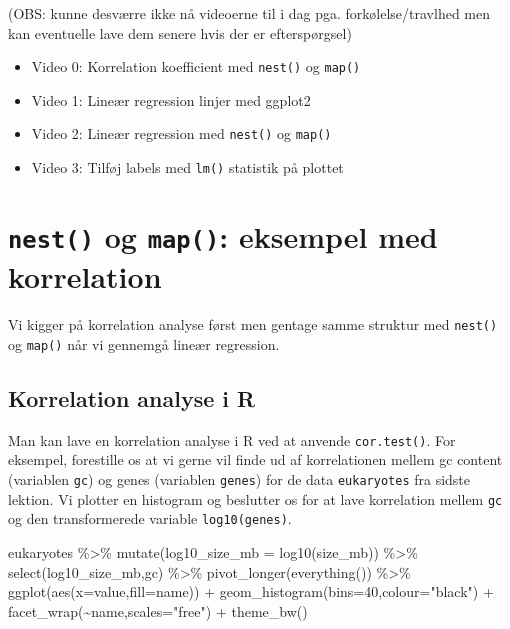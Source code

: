 \documentclass[
]{book}
\newenvironment{Shaded}{\begin{snugshade}}{\end{snugshade}}
\newcommand{\AttributeTok}[1]{\textcolor[rgb]{0.77,0.63,0.00}{#1}}
\newcommand{\DecValTok}[1]{\textcolor[rgb]{0.00,0.00,0.81}{#1}}
\newcommand{\FunctionTok}[1]{\textcolor[rgb]{0.00,0.00,0.00}{#1}}
\newcommand{\NormalTok}[1]{#1}
\newcommand{\SpecialCharTok}[1]{\textcolor[rgb]{0.00,0.00,0.00}{#1}}
\newcommand{\StringTok}[1]{\textcolor[rgb]{0.31,0.60,0.02}{#1}}
\providecommand{\tightlist}{%
  \setlength{\itemsep}{0pt}\setlength{\parskip}{0pt}}
\begin{document}
(OBS: kunne desværre ikke nå videoerne til i dag pga. forkølelse/travlhed men kan eventuelle lave dem senere hvis der er efterspørgsel)

\begin{itemize}
\tightlist
\item
  Video 0: Korrelation koefficient med \texttt{nest()} og \texttt{map()}
\item
  Video 1: Lineær regression linjer med ggplot2
\item
  Video 2: Lineær regression med \texttt{nest()} og \texttt{map()}
\item
  Video 3: Tilføj labels med \texttt{lm()} statistik på plottet
\end{itemize}

\hypertarget{nest-og-map-eksempel-med-korrelation}{%
\section{\texorpdfstring{\texttt{nest()} og \texttt{map()}: eksempel med korrelation}{nest() og map(): eksempel med korrelation}}\label{nest-og-map-eksempel-med-korrelation}}

Vi kigger på korrelation analyse først men gentage samme struktur med \texttt{nest()} og \texttt{map()} når vi gennemgå lineær regression.

\hypertarget{korrelation-analyse-i-r}{%
\subsection{Korrelation analyse i R}\label{korrelation-analyse-i-r}}

Man kan lave en korrelation analyse i R ved at anvende \texttt{cor.test()}. For eksempel, forestille os at vi gerne vil finde ud af korrelationen mellem gc content (variablen \texttt{gc}) og genes (variablen \texttt{genes}) for de data \texttt{eukaryotes} fra sidste lektion. Vi plotter en histogram og beslutter os for at lave korrelation mellem \texttt{gc} og den transformerede variable \texttt{log10(genes)}.

\begin{Shaded}
\begin{Highlighting}[]
\NormalTok{eukaryotes }\SpecialCharTok{\%\textgreater{}\%} 
  \FunctionTok{mutate}\NormalTok{(}\AttributeTok{log10\_size\_mb =} \FunctionTok{log10}\NormalTok{(size\_mb)) }\SpecialCharTok{\%\textgreater{}\%}
  \FunctionTok{select}\NormalTok{(log10\_size\_mb,gc) }\SpecialCharTok{\%\textgreater{}\%} 
  \FunctionTok{pivot\_longer}\NormalTok{(}\FunctionTok{everything}\NormalTok{()) }\SpecialCharTok{\%\textgreater{}\%}
  \FunctionTok{ggplot}\NormalTok{(}\FunctionTok{aes}\NormalTok{(}\AttributeTok{x=}\NormalTok{value,}\AttributeTok{fill=}\NormalTok{name)) }\SpecialCharTok{+} 
  \FunctionTok{geom\_histogram}\NormalTok{(}\AttributeTok{bins=}\DecValTok{40}\NormalTok{,}\AttributeTok{colour=}\StringTok{"black"}\NormalTok{) }\SpecialCharTok{+}
  \FunctionTok{facet\_wrap}\NormalTok{(}\SpecialCharTok{\textasciitilde{}}\NormalTok{name,}\AttributeTok{scales=}\StringTok{"free"}\NormalTok{) }\SpecialCharTok{+}
  \FunctionTok{theme\_bw}\NormalTok{()}
\end{Highlighting}
\end{Shaded}
\end{document}
